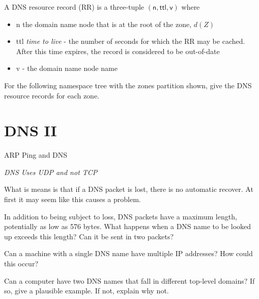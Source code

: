 A DNS resource record (RR) is a three-tuple $(\textsf{n},\textsf{ttl},\textsf{v})$
where\\
\begin{itemize}
\item \textsf{n} the domain name node that is at the root of the zone, $d(Z)$
\item \textsf{ttl} \textit{time to live} - the number of seconds for which the RR may be cached. After this time 
expires, the record is considered to be out-of-date 
\item \textsf{v} - the domain name node name
\end{itemize}

\frmrule 

\begin{example}
For the following namespace tree with the zones partition shown, 
give the DNS resource records for each zone. 
\end{example}

\frmrule 



\section{DNS II}

ARP Ping and DNS


\frmrule 

\textit{DNS Uses UDP and not TCP}

What is means is that if a DNS packet is lost, there is no automatic recover. 
At first it may seem like this causes a problem. 


\frmrule

In addition to being subject to loss, DNS packets have a maximum length,
potentially as low as 576 bytes. What happens when a DNS name to be looked
up exceeds this length? Can it be sent in two packets?

\frmrule

Can a machine with a single DNS name have multiple IP addresses? How
could this occur?

\frmrule

Can a computer have two DNS names that fall in different top-level domains?
If so, give a plausible example. If not, explain why not.


